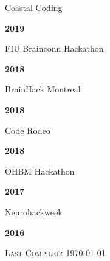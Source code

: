 \documentclass[10pt]{article}
\newenvironment{bottompar}{\par\vspace*{\fill}}{\clearpage}
\newcommand{\headstyle}{\scshape \normalsize \textcolor{light-gray}}
\begin{document}
\begin{minipage}[t]{.85\linewidth}
	\flushleft
	\noindent
	Coastal Coding
	\end{minipage}
	\hfill
	\begin{minipage}[t]{.15\linewidth}
	\flushright
	\noindent
	\textsc{\textbf{2019}}
\end{minipage}

\begin{minipage}[t]{.85\linewidth}
	\flushleft
	\noindent
	FIU Brainconn Hackathon
	\end{minipage}
	\hfill
	\begin{minipage}[t]{.15\linewidth}
	\flushright
	\noindent
	\textsc{\textbf{2018}}
\end{minipage}

\begin{minipage}[t]{.85\linewidth}
	\flushleft
	\noindent
	BrainHack Montreal
	\end{minipage}
	\hfill
	\begin{minipage}[t]{.15\linewidth}
	\flushright
	\noindent
	\textsc{\textbf{2018}}
\end{minipage}

\begin{minipage}[t]{.85\linewidth}
	\flushleft
	\noindent
	Code Rodeo
	\end{minipage}
	\hfill
	\begin{minipage}[t]{.15\linewidth}
	\flushright
	\noindent
	\textsc{\textbf{2018}}
\end{minipage}

\begin{minipage}[t]{.85\linewidth}
	\flushleft
	\noindent
	OHBM Hackathon
	\end{minipage}
	\hfill
	\begin{minipage}[t]{.15\linewidth}
	\flushright
	\noindent
	\textsc{\textbf{2017}}
\end{minipage}

\begin{minipage}[t]{.85\linewidth}
	\flushleft
	\noindent
	Neurohackweek
	\end{minipage}
	\hfill
	\begin{minipage}[t]{.15\linewidth}
	\flushright
	\noindent
	\textsc{\textbf{2016}}
\end{minipage}

\begin{bottompar}
	\begin{center}
		\headstyle{Last Compiled: \today}
	\end{center}
\end{bottompar}
\end{document}

